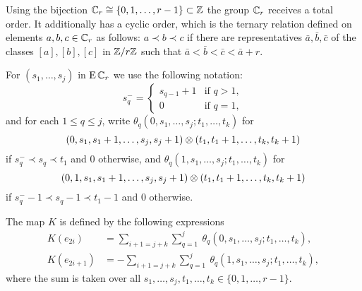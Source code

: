 Using the bijection $\mathbb{C}_r \cong \{0,1,\dots,r-1\} \subset \mathbb{Z}$ the group $\mathbb{C}_r$ receives a total order.
It additionally has a cyclic order, which is the ternary relation defined on elements $a,b,c \in \mathbb{C}_r$ as follows:
$a \prec b \prec c$ if there are representatives $\bar{a},\bar{b},\bar{c}$ of the classes $[a],[b],[c]$ in $\mathbb{Z}/r\mathbb{Z}$ such that $\bar{a} < \bar{b} < \bar{c} < \bar{a}+r$.

For $(s_1,\dots,s_j)$ in $\operatorname{E}\mathbb{C}_r$ we use the following notation:
\[
s_q^- =
\begin{cases}
	s_{q-1}+1 & \text{if } q>1, \\
	0 & \text{if } q=1,
\end{cases}
\]
and for each $1\leq q\leq j$, write $\theta_q(0,s_1,\dots,s_j;t_1,\dots,t_k)$ for
\[
(0,s_1,s_1+1,\dots,s_j,s_j+1)\otimes (t_1,t_1+1,\dots,t_k,t_k+1)
\]
if $s_q^- \prec s_q \prec t_1$ and $0$ otherwise, and $\theta_q(1,s_1,\dots,s_j;t_1,\dots,t_k)$ for
\[
(0,1,s_1,s_1+1,\dots,s_j,s_j+1)\otimes (t_1,t_1+1,\dots,t_k,t_k+1)
\]
if $s_q^--1 \prec s_q-1 \prec t_1-1$ and $0$ otherwise.

\begin{lemma}
	The map $K$ is defined by the following expressions
	\begin{align} \label{eq:homotopyK'1}
		K(e_{2i}) &= \sum_{i+1 = j+k} \sum_{q=1}^j \
		\theta_q(0,s_1,\dots,s_j;t_1,\dots,t_k), \\ \label{eq:homotopyK'2}
		K(e_{2i+1}) &= -\sum_{i+1 = j+k} \sum_{q=1}^j \
		\theta_q(1,s_1,\dots,s_j;t_1,\dots,t_k),
	\end{align}
	where the sum is taken over all $s_1,\dots,s_j,t_1,\dots,t_k\in \{0,1,\dots,r-1\}$.
\end{lemma}

